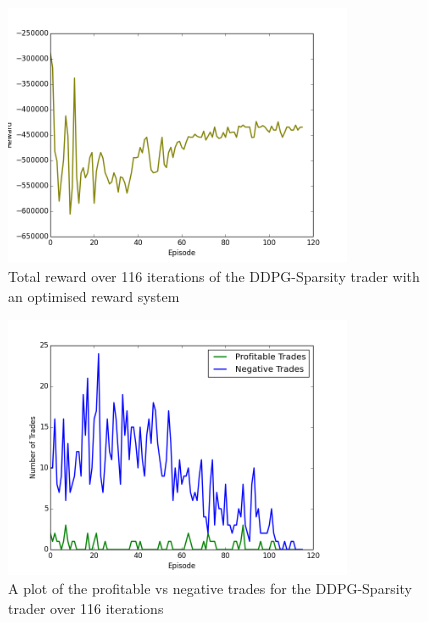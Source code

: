 \documentclass[ %
                    author={Ashwinder Khurana},
                supervisor={Prof Dave Cliff},
                    degree={MEng},
                     title={The Deeply Reinforced Trader},
                  subtitle={},
                      type={enterprise},
                      year={2020} ]{dissertation}
\begin{document}
{\begin{figure}[H] 
	\centering
  	\includegraphics[width=0.8\textwidth]{DDPG-Sparsity-Reward}
  	\caption{Total reward over 116 iterations of the DDPG-Sparsity trader with an optimised reward system }
	\label{fig:DDPG-Sparsity-Reward}  
\end{figure}

\begin{figure}[H] 
	\centering
  	\includegraphics[width=0.8\textwidth]{DDPG-Sparsity-Good-vs-Bad}
  	\caption{A plot of the profitable vs negative trades for the DDPG-Sparsity trader over 116 iterations}
	\label{fig:DDPG-Sparsity-Good-Vs-Bad}  
\end{figure}

}
\end{document}
